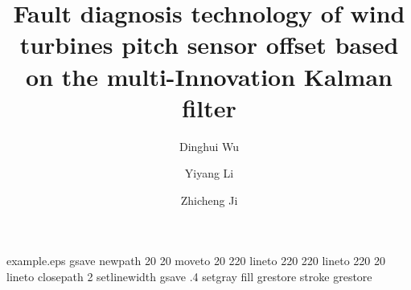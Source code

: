 

\begin{filecontents*}{example.eps}
gsave
newpath
  20 20 moveto
  20 220 lineto
  220 220 lineto
  220 20 lineto
closepath
2 setlinewidth
gsave
  .4 setgray fill
grestore
stroke
grestore
\end{filecontents*}
%
\RequirePackage{fix-cm}
%

\documentclass[fleqn,smallextended]{svjour3}       %
%
\usepackage{amsfonts}
\usepackage{mathrsfs}
 \usepackage{amssymb}
 \usepackage{amsmath}
 \usepackage{bm}
 \usepackage[dvips]{color}
\allowdisplaybreaks

 \textwidth5.8in

%
\smartqed  %
%
\usepackage{graphicx}
%
%
%
%




\title{Fault diagnosis technology of  wind turbines pitch sensor offset based on the multi-Innovation Kalman filter}
\author{Dinghui Wu \and Yiyang Li \and Zhicheng Ji} %


